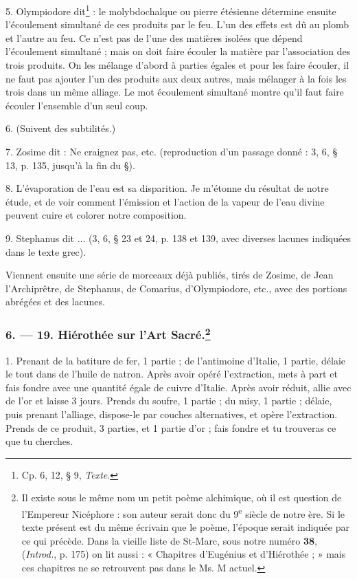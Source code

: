 \documentclass[a4paper, 11pt, oneside, polutonikogreek, french]{article}
\begin{document}
5. Olympiodore dit\footnote{Cp. 6, 12, § 9, \emph{Texte}.} : le molybdochalque ou pierre étésienne détermine ensuite l'écoulement simultané de ces produits par le feu. L'un des effets est dû au plomb et l'autre au feu. Ce n'est pas de l'une des matières isolées que dépend l'écoulement simultané ; mais on doit faire écouler la matière par l'association des trois produits. On les mélange d'abord à parties égales et pour les faire écouler, il ne faut pas ajouter l'un des produits aux deux autres, mais mélanger à la fois les trois dans un même alliage. Le mot écoulement simultané montre qu'il faut faire écouler l'ensemble d'un seul coup.

6. (Suivent des subtilités.)

7. Zosime dit : Ne craignez pas, etc. (reproduction d'un passage donné : 3, 6, § 13, p. 135, jusqu'à la fin du §).

8. L'évaporation de l'eau est sa disparition. Je m'étonne du résultat de notre étude, et de voir comment l'émission et l'action de la vapeur de l'eau divine peuvent cuire et colorer notre composition.

9. Stephanus dit ... (3, 6, § 23 et 24, p. 138 et 139, avec diverses lacunes indiquées dans le texte grec).

Viennent ensuite une série de morceaux déjà publiés, tirés de Zosime, de Jean l'Archiprêtre, de Stephanus, de Comarius, d'Olympiodore, etc., avec des portions abrégées et des lacunes.

\bigskip
\centerline{\EightStarTaper}
\centerline{\EightStarTaper\EightStarTaper}
\bigskip

\subsubsection[6. --- 19. Hiérothée sur l'Art Sacré.]{6. --- 19. Hiérothée sur l'Art Sacré.\footnote{Il existe sous le même nom un petit poème alchimique, où il est question de l'Empereur Nicéphore : son auteur serait donc du 9\textsuperscript{e} siècle de notre ère. Si le texte présent est du même écrivain que le poème, l'époque serait indiquée par ce qui précède. Dans la vieille liste de St-Marc, sous notre numéro \textbf{38}, (\emph{Introd.}, p. 175) on lit aussi : « Chapitres d'Eugénius et d'Hiérothée ; » mais ces chapitres ne se retrouvent pas dans le Ms. M actuel.}}

1. Prenant de la batiture de fer, 1 partie ; de l'antimoine d'Italie, 1 partie, délaie le tout dans de l'huile de natron. Après avoir opéré l'extraction, mets à part et fais fondre avec une quantité égale de cuivre d'Italie. Après avoir réduit, allie avec de l'or et laisse 3 jours. Prends du soufre, 1 partie ; du misy, 1 partie ; délaie, puis prenant l'alliage, dispose-le par couches alternatives, et opère l'extraction. Prends de ce produit, 3 parties, et 1 partie d'or ; fais fondre et tu trouveras ce que tu cherches.
\end{document}
